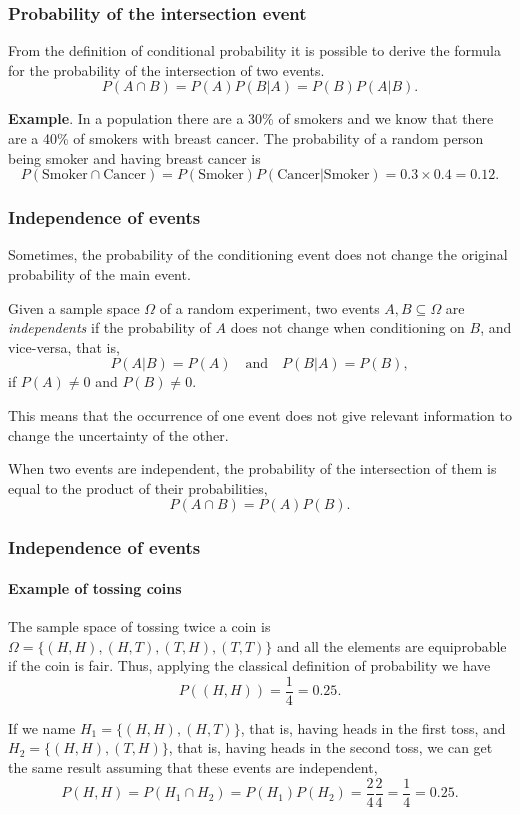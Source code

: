 \begin{frame}
\frametitle{Probability of the intersection event}
From the definition of conditional probability it is possible to derive the formula for the probability of the
intersection of two events. 
\[
P(A\cap B) = P(A)P(B|A) = P(B)P(A|B).
\]

\textbf{Example}. In a population there are a 30\% of smokers and we know that there are a 40\% of smokers with breast
cancer. 
The probability of a random person being smoker and having breast cancer is 
\[
P(\mbox{Smoker}\cap \mbox{Cancer})= P(\mbox{Smoker})P(\mbox{Cancer}|\mbox{Smoker}) =
0.3\times 0.4 = 0.12.
\]
\end{frame}


\begin{frame}
\frametitle{Independence of events}
Sometimes, the probability of the conditioning event does not change the original probability of the main event. 
\begin{definition}
Given a sample space $\Omega$ of a random experiment, two events  $A,B\subseteq \Omega$ are \emph{independents} if the probability of $A$ does not change when conditioning on $B$, and vice-versa, that is,
\[
P(A|B) = P(A) \quad \mbox{and} \quad P(B|A)=P(B),
\]
if $P(A)\neq 0$ and $P(B)\neq 0$.
\end{definition}

This means that the occurrence of one event does not give relevant information to change the uncertainty of the other.

When two events are independent, the probability of the intersection of them is equal to the product of their probabilities,
\[
P(A\cap B) = P(A)P(B).
\]
\end{frame}


\begin{frame}
\frametitle{Independence of events}
\framesubtitle{Example of tossing coins}
The sample space of tossing twice a coin is $\Omega=\{(H,H),(H,T),(T,H),(T,T)\}$ and all the elements are equiprobable if the coin is fair. 
Thus, applying the classical definition of probability we have 
\[
P((H,H)) = \frac{1}{4} = 0.25.
\]

If we name $H_1=\{(H,H),(H,T)\}$, that is, having heads in the first toss, and $H_2=\{(H,H),(T,H)\}$, that is, having
heads in the second toss, we can get the same result assuming that these events are independent,
\[
P(H,H)= P(H_1\cap H_2) = P(H_1)P(H_2) = \frac{2}{4}\frac{2}{4}=\frac{1}{4}=0.25.
\] 
\end{frame}


